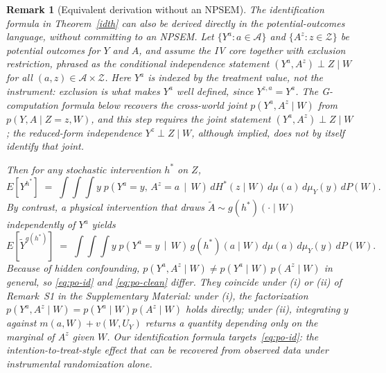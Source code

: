 \documentclass[12pt]{article}
\theoremstyle{thmstyleone}%
\theoremstyle{thmstyletwo}%
\newtheorem{rem}{Remark}%
\theoremstyle{thmstylethree}%
\begin{document}
	\begin{rem}[Equivalent derivation without an NPSEM]\label{rem:po}
 {The identification formula in Theorem~\ref{idth} can also be derived directly in the potential-outcomes language, without committing to an NPSEM. Let $\{Y^a : a\in\mathcal A\}$ and $\{A^z : z\in\mathcal Z\}$ be potential outcomes for $Y$ and $A$, and assume the IV core together with exclusion restriction, phrased as the conditional independence statement $(Y^a, A^z) \perp Z \mid W$ for all $(a,z)\in\mathcal A\times\mathcal Z$.}  {Here $Y^a$ is indexed by the treatment value, not the instrument: exclusion is what makes $Y^a$ well defined, since $Y^{z,a}=Y^a$. The G-computation formula below recovers the cross-world joint $p(Y^a,A^z\mid W)$ from $p(Y,A\mid Z=z,W)$, and this step requires the joint statement $(Y^a,A^z)\perp Z\mid W$; the reduced-form independence $Y^z\perp Z\mid W$, although implied, does not by itself identify that joint.}

 {Then for any stochastic intervention $h^*$ on $Z$,
	\begin{equation}\label{eq:po-id}
		E\!\left[Y^{h^*}\right] \;=\; \int\!\!\int\!\!\int y\; p\!\left(Y^a=y,\, A^z=a \,\middle|\, W\right)\, dH^*(z\mid W)\, d\mu(a)\, d\mu_Y(y)\, dP(W).
	\end{equation}
	By contrast, a physical intervention that draws $\widetilde A \sim g(h^*)(\cdot\mid W)$ \emph{independently} of $Y^a$ yields
	\begin{equation}\label{eq:po-clean}
		E\!\left[\widetilde Y^{g(h^*)}\right] \;=\; \int\!\!\int\!\!\int y\; p\!\left(Y^a=y \,\middle|\, W\right)\, g(h^*)(a\mid W)\, d\mu(a)\, d\mu_Y(y)\, dP(W).
	\end{equation}
	Because of hidden confounding, $p(Y^a, A^z\mid W) \neq p(Y^a\mid W)\, p(A^z\mid W)$ in general, so \eqref{eq:po-id} and \eqref{eq:po-clean} differ. They coincide under (i) or (ii) of Remark~S1 in the Supplementary Material: under (i), the factorization $p(Y^a,A^z\mid W) = p(Y^a\mid W) p(A^z\mid W)$ holds directly; under (ii), integrating $y$ against $m(a,W) + v(W,U_Y)$ returns a quantity depending only on the marginal of $A^z$ given $W$. Our identification formula targets~\eqref{eq:po-id}: the intention-to-treat-style effect that can be recovered from observed data under instrumental randomization alone.}
\end{rem}
	
\end{document}
